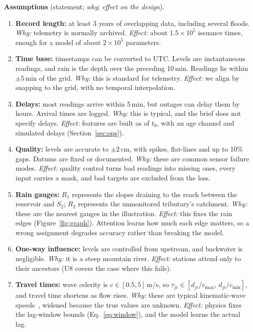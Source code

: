 \documentclass[11pt,a4paper]{article}
\begin{document}
\noindent\textbf{Assumptions} (statement; \emph{why}; \emph{effect on the design}).
\begin{enumerate}[label=\textbf{A\arabic*}, ref=A\arabic*, leftmargin=*]
  \item \textbf{Record length:} at least 3 years of overlapping data, including
  several floods. \emph{Why:} telemetry is normally archived.
  \emph{Effect:} about $1.5\times10^5$ issuance times, enough for a model of
  about $2\times10^5$ parameters.

  \item \textbf{Time base:} timestamps can be converted to UTC. Levels are
  instantaneous readings, and rain is the depth over the preceding 10\,min.
  Readings lie within $\pm5$\,min of the grid. \emph{Why:} this is standard for
  telemetry. \emph{Effect:} we align by snapping to the grid, with no temporal
  interpolation.

  \item \textbf{Delays:} most readings arrive within 5\,min, but outages can
  delay them by hours. Arrival times are logged. \emph{Why:} this is typical,
  and the brief does not specify delays. \emph{Effect:} features are built as of
  $t_0$, with an age channel and simulated delays (Section~\ref{sec:ops}).

  \item \textbf{Quality:} levels are accurate to $\pm2$\,cm, with spikes,
  flat-lines and up to 10\% gaps. Datums are fixed or documented.
  \emph{Why:} these are common sensor failure modes. \emph{Effect:} quality
  control turns bad readings into missing ones, every input carries a mask,
  and bad targets are excluded from the loss.

  \item \textbf{Rain gauges:} $R_1$ represents the slopes draining to the reach
  between the reservoir and $S_2$; $R_2$ represents the unmonitored
  tributary's catchment. \emph{Why:} these are the nearest gauges in the
  illustration. \emph{Effect:} this fixes the rain edges
  (Figure~\ref{fig:graph}). Attention learns how much each edge matters, so a
  wrong assignment degrades accuracy rather than breaking the model.

  \item \textbf{One-way influence:} levels are controlled from upstream, and
  backwater is negligible. \emph{Why:} it is a steep mountain river.
  \emph{Effect:} stations attend only to their ancestors (U8 covers the case
  where this fails).

  \item \textbf{Travel times:} wave celerity is $c\in[0.5,5]$\,m/s, so
  $\tau_{ji}\in[d_{ji}/c_{\max},\,d_{ji}/c_{\min}]$, and travel time shortens
  as flow rises. \emph{Why:} these are typical kinematic-wave
  speeds~\cite{chow}, widened because the true values are unknown.
  \emph{Effect:} physics fixes the lag-window bounds (Eq.~\ref{eq:window}),
  and the model learns the actual lag.


\end{enumerate}
\end{document}
